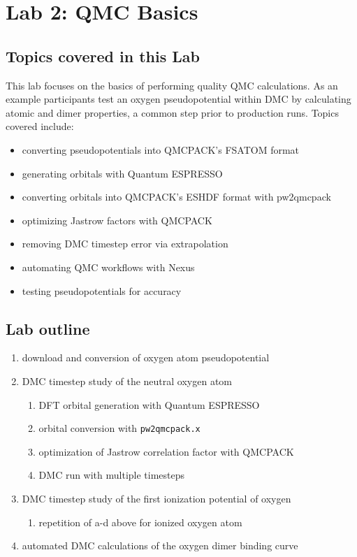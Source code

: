 \chapter{Lab 2: QMC Basics}
\label{chap:lab_qmc_basics}



\section{Topics covered in this Lab}
This lab focuses on the basics of performing quality QMC calculations.  As an example participants test an oxygen pseudopotential within DMC by calculating atomic and dimer properties, a common step prior to production runs.  Topics covered include:
\begin{itemize}
  \item{converting pseudopotentials into QMCPACK's FSATOM format}
  \item{generating orbitals with Quantum ESPRESSO}
  \item{converting orbitals into QMCPACK's ESHDF format with pw2qmcpack}
  \item{optimizing Jastrow factors with QMCPACK}
  \item{removing DMC timestep error via extrapolation}
  \item{automating QMC workflows with Nexus}
  \item{testing pseudopotentials for accuracy}
\end{itemize}

\section{Lab outline}
\begin{enumerate}
  \item{download and conversion of oxygen atom pseudopotential}
  \item{DMC timestep study of the neutral oxygen atom}
  \begin{enumerate}
    \item{DFT orbital generation with Quantum ESPRESSO}
    \item{orbital conversion with \texttt{pw2qmcpack.x}}
    \item{optimization of Jastrow correlation factor with QMCPACK}
    \item{DMC run with multiple timesteps}
  \end{enumerate}
  \item{DMC timestep study of the first ionization potential of oxygen}
  \begin{enumerate}
    \item{repetition of a-d above for ionized oxygen atom}
  \end{enumerate}
  \item{automated DMC calculations of the oxygen dimer binding curve}
\end{enumerate}


